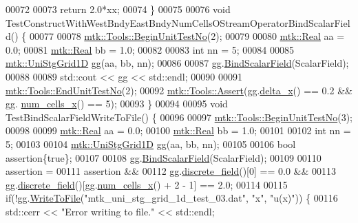 \begin{DoxyCode}
00072 
00073   \textcolor{keywordflow}{return} 2.0*xx;
00074 \}
00075 
00076 \textcolor{keywordtype}{void} TestConstructWithWestBndyEastBndyNumCellsOStreamOperatorBindScalarField() \{
00077 
00078   \hyperlink{classmtk_1_1Tools_afc29ecaf337a13ed2e817d3890a5a441}{mtk::Tools::BeginUnitTestNo}(2);
00079 
00080   \hyperlink{group__c01-roots_gac080bbbf5cbb5502c9f00405f894857d}{mtk::Real} aa = 0.0;
00081   \hyperlink{group__c01-roots_gac080bbbf5cbb5502c9f00405f894857d}{mtk::Real} bb = 1.0;
00082 
00083   \textcolor{keywordtype}{int} nn = 5;
00084 
00085   \hyperlink{classmtk_1_1UniStgGrid1D}{mtk::UniStgGrid1D} gg(aa, bb, nn);
00086 
00087   gg.\hyperlink{classmtk_1_1UniStgGrid1D_ab49f0009b66b0a58ae7f70a538f4d12b}{BindScalarField}(ScalarField);
00088 
00089   std::cout << gg << std::endl;
00090 
00091   \hyperlink{classmtk_1_1Tools_aba67d9dc35c9c1c49430fcc9ea035e03}{mtk::Tools::EndUnitTestNo}(2);
00092   \hyperlink{classmtk_1_1Tools_ac6804df469c94ab6a796fb64f1e44a89}{mtk::Tools::Assert}(gg.\hyperlink{classmtk_1_1UniStgGrid1D_a6e7173b01241632cf509496d66b9f74c}{delta\_x}() == 0.2 && gg.
      \hyperlink{classmtk_1_1UniStgGrid1D_af1b3729d8afa07be5b2775ed68015b80}{num\_cells\_x}() == 5);
00093 \}
00094 
00095 \textcolor{keywordtype}{void} TestBindScalarFieldWriteToFile() \{
00096 
00097   \hyperlink{classmtk_1_1Tools_afc29ecaf337a13ed2e817d3890a5a441}{mtk::Tools::BeginUnitTestNo}(3);
00098 
00099   \hyperlink{group__c01-roots_gac080bbbf5cbb5502c9f00405f894857d}{mtk::Real} aa = 0.0;
00100   \hyperlink{group__c01-roots_gac080bbbf5cbb5502c9f00405f894857d}{mtk::Real} bb = 1.0;
00101 
00102   \textcolor{keywordtype}{int} nn = 5;
00103 
00104   \hyperlink{classmtk_1_1UniStgGrid1D}{mtk::UniStgGrid1D} gg(aa, bb, nn);
00105 
00106   \textcolor{keywordtype}{bool} assertion\{\textcolor{keyword}{true}\};
00107 
00108   gg.\hyperlink{classmtk_1_1UniStgGrid1D_ab49f0009b66b0a58ae7f70a538f4d12b}{BindScalarField}(ScalarField);
00109 
00110   assertion =
00111     assertion &&
00112     gg.\hyperlink{classmtk_1_1UniStgGrid1D_ab9c3f9ee2ac76a351b01e4abfede4d19}{discrete\_field}()[0] == 0.0 &&
00113     gg.\hyperlink{classmtk_1_1UniStgGrid1D_ab9c3f9ee2ac76a351b01e4abfede4d19}{discrete\_field}()[gg.\hyperlink{classmtk_1_1UniStgGrid1D_af1b3729d8afa07be5b2775ed68015b80}{num\_cells\_x}() + 2 - 1] == 2.0;
00114 
00115   \textcolor{keywordflow}{if}(!gg.\hyperlink{classmtk_1_1UniStgGrid1D_a6d2c10aa9468a037829f0eb043b898dc}{WriteToFile}(\textcolor{stringliteral}{"mtk\_uni\_stg\_grid\_1d\_test\_03.dat"}, \textcolor{stringliteral}{"x"}, \textcolor{stringliteral}{"u(x)"})) \{
00116     std::cerr << \textcolor{stringliteral}{"Error writing to file."} << std::endl;

\end{DoxyCode}

